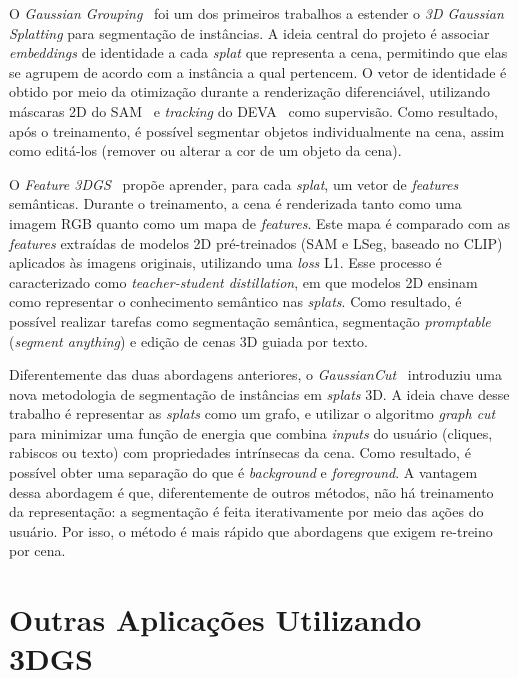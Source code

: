 O \textit{Gaussian Grouping}~\cite{ye2024gaussian} foi um dos primeiros trabalhos a estender o \textit{3D Gaussian Splatting} para segmentação de instâncias. A ideia central do projeto é associar \textit{embeddings} de identidade a cada \emph{splat} que representa a cena, permitindo que elas se agrupem de acordo com a instância a qual pertencem. O vetor de identidade é obtido por meio da otimização durante a renderização diferenciável, utilizando máscaras 2D do SAM~\cite{kirillov2023segment} e \textit{tracking} do DEVA~\cite{cheng2023tracking} como supervisão. Como resultado, após o treinamento, é possível segmentar objetos individualmente na cena, assim como editá-los (remover ou alterar a cor de um objeto da cena).

O \textit{Feature 3DGS}~\cite{Zhou_2024_CVPR} propõe aprender, para cada \emph{splat}, um vetor de \textit{features} semânticas. Durante o treinamento, a cena é renderizada tanto como uma imagem RGB quanto como um mapa de \textit{features}. Este mapa é comparado com as \textit{features} extraídas de modelos 2D pré-treinados (SAM e LSeg, baseado no CLIP) aplicados às imagens originais, utilizando uma \emph{loss} L1. Esse processo é caracterizado como \textit{teacher-student distillation}, em que modelos 2D ensinam como representar o conhecimento semântico nas \emph{splats}. Como resultado, é possível realizar tarefas como segmentação semântica, segmentação \textit{promptable} (\textit{segment anything}) e edição de cenas 3D guiada por texto.

Diferentemente das duas abordagens anteriores, o \textit{GaussianCut}~\cite{jain2024gaussiancut} introduziu uma nova metodologia de segmentação de instâncias em \emph{splats} 3D. A ideia chave desse trabalho é representar as \emph{splats} como um grafo, e utilizar o algoritmo \textit{graph cut} para minimizar uma função de energia que combina \textit{inputs} do usuário (cliques, rabiscos ou texto) com propriedades intrínsecas da cena. Como resultado, é possível obter uma separação do que é \textit{background} e \textit{foreground}. A vantagem dessa abordagem é que, diferentemente de outros métodos, não há treinamento da representação: a segmentação é feita iterativamente por meio das ações do usuário. Por isso, o método é mais rápido que abordagens que exigem re-treino por cena.

\section{Outras Aplicações Utilizando 3DGS}
\label{sec:rev_outras_aplicacoes}

